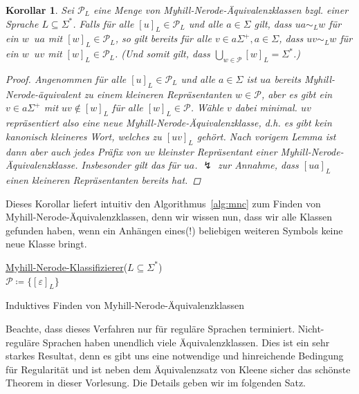 \documentclass[11pt, a4paper]{article}
\theoremstyle{definition}
\theoremstyle{plain}
\newtheorem{corollary}[definition]{Korollar}
\numberwithin{equation}{section}
\DeclareMathOperator{\canon}{\prec_\text{cn}}
\begin{document}
\begin{corollary}\label{cor:mn_allfound}
	Sei $\mathcal{P}_L$ eine Menge von Myhill-Nerode-Äquivalenzklassen bzgl. einer Sprache $L \subseteq \Sigma^\ast$. Falls für alle $[u]_L \in \mathcal{P}_L$ und alle $a \in \Sigma$ gilt, dass $ua \sim_L w$ für ein $w \canon ua$ mit $[w]_L \in \mathcal{P}_L$, so gilt bereits für alle $v \in a\Sigma^+, a \in \Sigma$, dass $uv \sim_L w$ für ein $w \canon uv$ mit $[w]_L \in \mathcal{P}_L$. (Und somit gilt, dass $\bigcup_{w \in \mathcal{P}} [w]_L = \Sigma^\ast$.)
	\begin{proof}
		Angenommen für alle $[u]_L\in \mathcal{P}_L$ und alle $a \in \Sigma$ ist $ua$ bereits Myhill-Nerode-äquivalent zu einem kleineren Repräsentanten $w \in \mathcal{P}$, aber es gibt ein $v \in a\Sigma^+$ mit $uv \notin [w]_L$ für alle $[w]_L \in \mathcal{P}$. Wähle $v$ dabei minimal. $uv$ repräsentiert also eine neue Myhill-Nerode-Äquivalenzklasse, d.h. es gibt kein kanonisch kleineres Wort, welches zu $[uv]_L$ gehört. Nach vorigem Lemma ist dann aber auch jedes Präfix von $uv$ kleinster Repräsentant einer Myhill-Nerode-Äquivalenzklasse. Insbesonder gilt das für $ua$. $\lightning$ zur Annahme, dass $[ua]_L$ einen kleineren Repräsentanten bereits hat.
	\end{proof}
\end{corollary}
Dieses Korollar liefert intuitiv den Algorithmus~\ref{alg:mnc} zum Finden von Myhill-Nerode-Ä\-qui\-va\-lenz\-klas\-sen, denn wir wissen nun, dass wir alle Klassen gefunden haben, wenn ein Anhängen eines(!) beliebigen weiteren Symbols keine neue Klasse bringt.
\begin{algorithm}
	\underline{Myhill-Nerode-Klassifizierer}{($L \subseteq \Sigma^\ast$)}\\
	$\mathcal{P} \coloneqq \{[\varepsilon]_L\}$\\
	\caption{Induktives Finden von Myhill-Nerode-Äquivalenzklassen}
	\label{alg:mnc}
\end{algorithm}
Beachte, dass dieses Verfahren nur für reguläre Sprachen terminiert. Nicht-reguläre Sprachen haben unendlich viele Äquivalenzklassen. Dies ist ein sehr starkes Resultat, denn es gibt uns eine notwendige und hinreichende Bedingung für Regularität und ist neben dem Äquivalenzsatz von Kleene sicher das schönste Theorem in dieser Vorlesung. Die Details geben wir im folgenden Satz.
\end{document}
